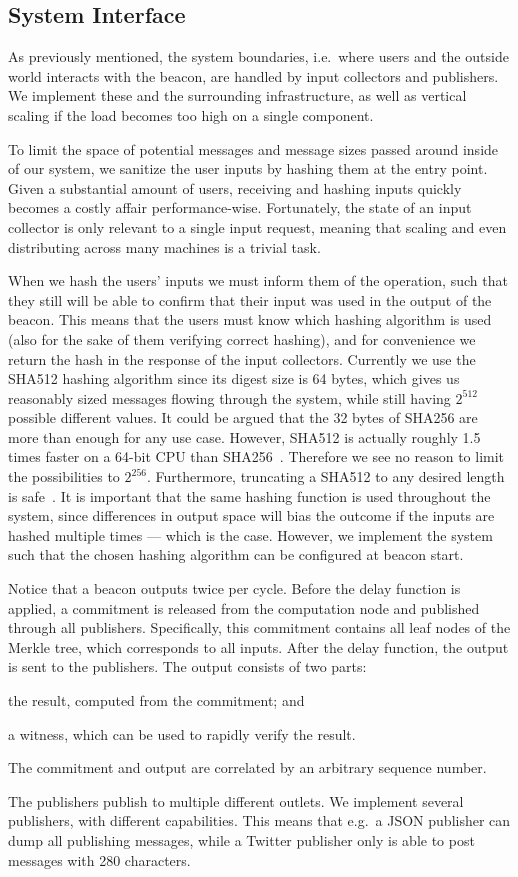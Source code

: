 \subsection{System Interface}%
\label{sub:system_interface}
As previously mentioned, the system boundaries, i.e.\ where users and the outside world interacts with the beacon, are handled by input collectors and publishers.
We implement these and the surrounding infrastructure, as well as vertical scaling if the load becomes too high on a single component.

To limit the space of potential messages and message sizes passed around inside of our system, we sanitize the user inputs by hashing them at the entry point. 
Given a substantial amount of users, receiving and hashing inputs quickly becomes a costly affair performance-wise.
Fortunately, the state of an input collector is only relevant to a single input request, meaning that scaling and even distributing across many machines is a trivial task.

When we hash the users' inputs we must inform them of the operation, such that they still will be able to confirm that their input was used in the output of the beacon.
This means that the users must know which hashing algorithm is used (also for the sake of them verifying correct hashing), and for convenience we return the hash in the response of the input collectors.
Currently we use the SHA512 hashing algorithm since its digest size is 64 bytes, which gives us reasonably sized messages flowing through the system, while still having $2^{512}$ possible different values. It could be argued that the 32 bytes of SHA256 are more than enough for any use case. However, SHA512 is actually roughly 1.5 times faster on a 64-bit CPU than SHA256~\cite{sha512faster}. Therefore we see no reason to limit the possibilities to $2^{256}$. Furthermore, truncating a SHA512 to any desired length is safe~\cite{sha512faster}.
It is important that the same hashing function is used throughout the system, since differences in output space will bias the outcome if the inputs are hashed multiple times --- which is the case.
However, we implement the system such that the chosen hashing algorithm can be configured at beacon start.

Notice that a beacon outputs twice per cycle. Before the delay function is applied, a commitment is released from the computation node and published through all publishers. Specifically, this commitment contains all leaf nodes of the Merkle tree, which corresponds to all inputs. After the delay function, the output is sent to the publishers. The output consists of two parts:
\begin{eletterate*}
    \item the result, computed from the commitment; and
    \item a witness, which can be used to rapidly verify the result.
\end{eletterate*}
The commitment and output are correlated by an arbitrary sequence number.

The publishers publish to multiple different outlets.
We implement several publishers, with different capabilities.
This means that e.g.\ a JSON publisher can dump all publishing messages, while a Twitter publisher only is able to post messages with 280 characters.
